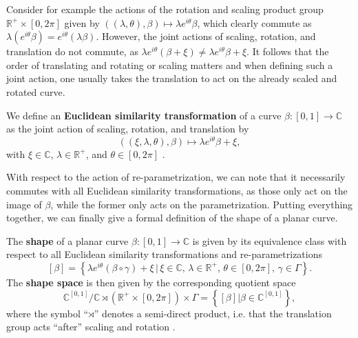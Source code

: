 Consider for example the actions of the rotation and scaling product group
$\mathbb{R}^+ \times [0,2\pi]$ given by $((\lambda, \theta), \beta) \mapsto
\lambda e^{i\theta} \beta$, which clearly commute as $\lambda
(e^{i\theta}\beta) = e^{i\theta}(\lambda\beta)$.
However, the joint actions of scaling, rotation, and translation do not
commute, as $\lambda e^{i\theta}(\beta + \xi) \neq \lambda e^{i\theta}\beta +
\xi$.
It follows that the order of translating and rotating or scaling matters and
when defining such a joint action, one usually takes the translation to act on
the already scaled and rotated curve.
\begin{definition} 
  We define an \textbf{Euclidean similarity transformation} of a curve $\beta :
  [0,1] \rightarrow \mathbb{C}$ as the joint action of scaling, rotation, and
  translation by 
  $$((\xi, \lambda, \theta), \beta) \mapsto \lambda e^{i\theta} \beta + \xi,$$
  with $\xi \in \mathbb{C}$, $\lambda \in \mathbb{R}^+$, and $\theta \in
  [0,2\pi]$ \parencite[see][62]{DrydenMardia2016}.
\end{definition}
\noindent With respect to the action of re-parametrization, we can note that it
necessarily commutes with all Euclidean similarity transformations, as those
only act on the image of $\beta$, while the former only acts on the
parametrization.
Putting everything together, we can finally give a formal definition of the
shape of a planar curve.
\begin{definition}[Shape]
  The \textbf{shape} of a planar curve $\beta : [0,1] \rightarrow \mathbb{C}$
  is given by its equivalence class with respect to all Euclidean similarity
  transformations and re-parametrizations
  $$ [\beta] = \left\{\lambda e^{i\theta}(\beta \circ \gamma) + \xi\,|\, \xi
  \in \mathbb{C},\, \lambda \in \mathbb{R}^+,\, \theta \in [0,2\pi],\, \gamma
  \in \Gamma\right\}. $$
  The \textbf{shape space} is then given by the corresponding quotient space 
  $$\mathbb{C}^{[0,1]} \big/ \mathbb{C} \rtimes \left( \mathbb{R}^+ \times
  [0,2\pi] \right) \times \Gamma = \left\{[\beta]|\beta \in
  \mathbb{C}^{[0,1]}\right\},$$
  where the symbol \enquote{$\rtimes$} denotes a semi-direct product, i.e. that
  the translation group acts \enquote{after} scaling and rotation
  \parencite[for details see][Chapter 3]{SrivastavaKlassen2016}.
\end{definition}

